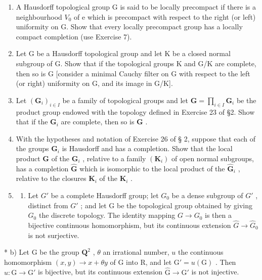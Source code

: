\begin{enumerate}
\def\labelenumi{\arabic{enumi})}
\setcounter{enumi}{7}
\item
  A Hausdorff topological group G is said to be locally precompact if there is a neighbourhood \(V_{0}\) of e which is precompact with respect to the right (or left) uniformity on G. Show that every locally precompact group has a locally compact completion (use Exercise 7).
\item
  Let G be a Hausdorff topological group and let K be a closed normal subgroup of G. Show that if the topological groups K and G/K are complete, then so is G {[}consider a minimal Cauchy filter on G with respect to the left (or right) uniformity on G, and its image in G/K{]}.
\item
  Let \((\mathbf{G}_i)_{i\in I}\) be a family of topological groups and let \(\mathbf{G} = \prod_{i\in I}\mathbf{G}_i\) be the product group endowed with the topology defined in Exercise 23 of §2. Show that if the \(\mathbf{G}_i\) are complete, then so is \(\mathbf{G}\) .
\item
  With the hypotheses and notation of Exercise 26 of § 2, suppose that each of the groups \(\mathbf{G}_{i}\) is Hausdorff and has a completion. Show that the local product \(\mathbf{G}\) of the \(\mathbf{G}_{i}\) , relative to a family \((\mathbf{K}_{i})\) of open normal subgroups, has a completion \(\hat{\mathbf{G}}\) which is isomorphic to the local product of the \(\hat{\mathbf{G}}_{i}\) , relative to the closures \(\mathbf{K}_{i}\) of the \(\mathbf{K}_{i}\) .
\item
  \begin{enumerate}
  \def\labelenumii{\alph{enumii})}
  \tightlist
  \item
    Let \(G'\) be a complete Hausdorff group; let \(G_{0}\) be a dense subgroup of \(G'\) , distinct from \(G'\) ; and let G be the topological group obtained by giving \(G_{0}\) the discrete topology. The identity mapping \(G \rightarrow G_{0}\) is then a bijective continuous homomorphism, but its continuous extension \(\hat{G} \rightarrow \hat{G}_{0}\) is not surjective.
  \end{enumerate}
\end{enumerate}

* b) Let G be the group \(\mathbf{Q}^2\) , \(\theta\) an irrational number, \(u\) the continuous homomorphism \((x,y)\to x + \theta y\) of G into R, and let \(\mathrm{G}' = u(\mathrm{G})\) . Then \(u: \mathrm{G}\to \mathrm{G}'\) is bijective, but its continuous extension \(\hat{\mathrm{G}}\to \hat{\mathrm{G}}'\) is not injective.

